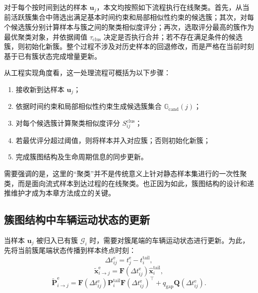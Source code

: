 \documentclass{xdupgthesis}
\begin{document}
对于每个按时间到达的样本 $\mathbf{u}_j$，本文均按照如下流程执行在线聚类。首先，从当前活跃簇集合中筛选出满足基本时间约束和局部相似性约束的候选簇；其次，对每个候选簇分别计算样本与簇之间的聚类相似度评分；再次，选取评分最高的簇作为最优聚类对象，并依据阈值 $\tau_{\mathrm{clus}}$ 决定是否执行合并；若不存在满足条件的候选簇，则初始化新簇。整个过程不涉及对历史样本的回退修改，而是严格在当前时刻基于已有簇状态完成增量更新。

从工程实现角度看，这一处理流程可概括为以下步骤：
\begin{enumerate}
	\item 接收新到达样本 $\mathbf{u}_j$；
	\item 依据时间约束和局部相似性约束生成候选簇集合 $\mathbb{G}_{\mathrm{cand}}(j)$；
	\item 对每个候选簇计算聚类相似度评分 $S_{ij}^{\mathrm{clus}}$；
	\item 若最优评分超过阈值，则将样本并入对应簇；否则初始化新簇；
	\item 完成簇图结构及生命周期信息的同步更新。
\end{enumerate}
需要强调的是，这里的“聚类”并不是传统意义上针对静态样本集进行的一次性聚类，而是面向流式样本到达过程的在线聚类。也正因为如此，簇图结构的设计和递推维护才成为本章方法成立的关键。

\subsection{簇图结构中车辆运动状态的更新}

当样本 $\mathbf{u}_j$ 被归入已有簇 $\mathcal{G}_i$ 时，需要对簇尾端的车辆运动状态进行更新。为此，先将当前簇尾端状态传播到样本终点时刻：
\begin{equation}
	\Delta t_{ij}^{\mathrm{e}} = t_j^{\mathrm{e}} - t_i^{\mathrm{tail}},
\end{equation}
\begin{equation}
	\tilde{\mathbf{x}}_{i\rightarrow j}^{\mathrm{e}}
	=
	\mathbf{F}(\Delta t_{ij}^{\mathrm{e}})
	\hat{\mathbf{x}}_i^{\mathrm{tail}},
\end{equation}
\begin{equation}
	\tilde{\mathbf{P}}_{i\rightarrow j}^{\mathrm{e}}
	=
	\mathbf{F}(\Delta t_{ij}^{\mathrm{e}})
	\mathbf{P}_i^{\mathrm{tail}}
	\mathbf{F}(\Delta t_{ij}^{\mathrm{e}})^{\top}
	+
	q_{\mathrm{gap}}\mathbf{Q}(\Delta t_{ij}^{\mathrm{e}}).
\end{equation}
\end{document}
